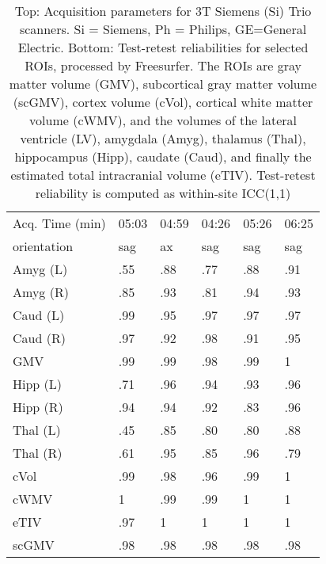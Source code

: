 \begin{table}
\begin{tabular}{llllll}
Acq. Time (min)       &           05:03 &           04:59 &           04:26 &           05:26 &           06:25 \\
orientation           &                sag &                 ax &                sag &                sag &                sag \\
Amyg (L)              &               .55 &               .88 &               .77 &               .88 &               .91 \\
Amyg (R)              &               .85 &               .93 &               .81 &               .94 &               .93 \\
Caud (L)              &               .99 &               .95 &               .97 &               .97 &               .97 \\
Caud (R)              &               .97 &               .92 &               .98 &               .91 &               .95 \\
GMV                   &               .99 &               .99 &               .98 &               .99 &               1   \\
Hipp (L)              &               .71 &               .96 &               .94 &               .93 &               .96 \\
Hipp (R)              &               .94 &               .94 &               .92 &               .83 &               .96 \\
Thal (L)              &               .45 &               .85 &               .80 &               .80 &               .88 \\
Thal (R)              &               .61 &               .95 &               .85 &               .96 &               .79 \\
cVol                  &               .99 &               .98 &               .96 &               .99 &               1   \\
cWMV                  &               1   &               .99 &               .99 &               1   &               1   \\
eTIV                  &               .97 &               1   &               1   &               1   &               1   \\
scGMV                 &               .98 &               .98 &               .98 &               .98 &               .98 \\
\bottomrule
\end{tabular}
\caption{Top: Acquisition parameters for 3T Siemens (Si) Trio scanners. Si = Siemens, Ph = Philips, GE=General Electric. Bottom: Test-retest reliabilities for selected ROIs, processed by Freesurfer. The ROIs are gray matter volume (GMV), subcortical gray matter volume (scGMV), cortex volume (cVol), cortical white matter volume (cWMV), and the volumes of the lateral ventricle (LV), amygdala (Amyg), thalamus (Thal), hippocampus (Hipp), caudate (Caud), and finally the estimated total intracranial volume (eTIV). Test-retest reliability is computed as within-site ICC(1,1)} 
\label{tab:acquisition4}

\end{table}